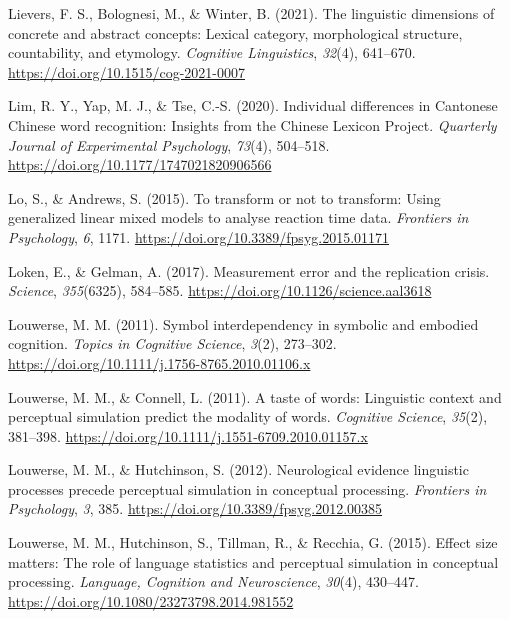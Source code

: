 \documentclass[
  12pt,
  man,floatsintext]{apa7}
\newlength{\cslhangindent}
\newlength{\cslentryspacingunit} %
\newenvironment{CSLReferences}[2] %
 {%
  \setlength{\parindent}{0pt}
  \ifodd #1
  \let\oldpar\par
  \def\par{\hangindent=\cslhangindent\oldpar}
  \fi
  \setlength{\parskip}{#2\cslentryspacingunit}
 }%
 {}
\begin{document}
\begin{CSLReferences}{1}{0}
\leavevmode{}%
Lievers, F. S., Bolognesi, M., \& Winter, B. (2021). The linguistic dimensions of concrete and abstract concepts: Lexical category, morphological structure, countability, and etymology. \emph{Cognitive Linguistics}, \emph{32}(4), 641--670. \url{https://doi.org/10.1515/cog-2021-0007}

\leavevmode{}%
Lim, R. Y., Yap, M. J., \& Tse, C.-S. (2020). Individual differences in {Cantonese Chinese} word recognition: {Insights} from the {Chinese Lexicon Project}. \emph{Quarterly Journal of Experimental Psychology}, \emph{73}(4), 504--518. \url{https://doi.org/10.1177/1747021820906566}

\leavevmode{}%
Lo, S., \& Andrews, S. (2015). To transform or not to transform: Using generalized linear mixed models to analyse reaction time data. \emph{Frontiers in Psychology}, \emph{6}, 1171. \url{https://doi.org/10.3389/fpsyg.2015.01171}

\leavevmode{}%
Loken, E., \& Gelman, A. (2017). Measurement error and the replication crisis. \emph{Science}, \emph{355}(6325), 584--585. \url{https://doi.org/10.1126/science.aal3618}

\leavevmode{}%
Louwerse, M. M. (2011). Symbol interdependency in symbolic and embodied cognition. \emph{Topics in Cognitive Science}, \emph{3}(2), 273--302. \url{https://doi.org/10.1111/j.1756-8765.2010.01106.x}

\leavevmode{}%
Louwerse, M. M., \& Connell, L. (2011). A taste of words: Linguistic context and perceptual simulation predict the modality of words. \emph{Cognitive Science}, \emph{35}(2), 381--398. \url{https://doi.org/10.1111/j.1551-6709.2010.01157.x}

\leavevmode{}%
Louwerse, M. M., \& Hutchinson, S. (2012). Neurological evidence linguistic processes precede perceptual simulation in conceptual processing. \emph{Frontiers in Psychology}, \emph{3}, 385. \url{https://doi.org/10.3389/fpsyg.2012.00385}

\leavevmode{}%
Louwerse, M. M., Hutchinson, S., Tillman, R., \& Recchia, G. (2015). Effect size matters: {The} role of language statistics and perceptual simulation in conceptual processing. \emph{Language, Cognition and Neuroscience}, \emph{30}(4), 430--447. \url{https://doi.org/10.1080/23273798.2014.981552}


\end{CSLReferences}
\end{document}
